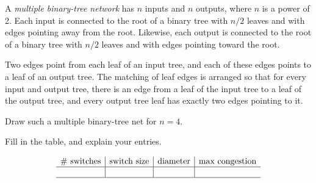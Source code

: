 \documentclass[12pt,twoside]{article}
\begin{document}
\begin{problem}{10}
A \emph{multiple binary-tree network} has $n$ inputs and $n$ outputs, where $n$ is
a power of 2.  Each input is connected to the root of a binary tree with
$n/2$ leaves and with edges pointing away from the root.  Likewise, each
output is connected to the root of a binary tree with $n/2$ leaves and
with edges pointing toward the root.

Two edges point from each leaf of an input tree, and each of these edges
points to a leaf of an output tree.  The matching of leaf edges is
arranged so that for every input and output tree, there is an edge from a
leaf of the input tree to a leaf of the output tree, and every output tree
leaf has exactly two edges pointing to it.

\bparts
{} Draw such a multiple binary-tree net for $n=4$.


 Fill in the table, and explain your entries.

{\large
\[
\begin{array}{c|c|c|c}
\text{\# switches} &
\text{switch size} &
\text{diameter} &
\text{max congestion} \\ \hline
&&&\\ \hline
\end{array}
\]
}


\end{problem}
\end{document}
